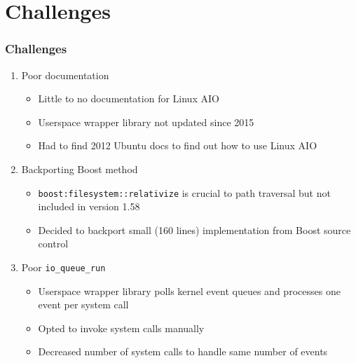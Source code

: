 \documentclass{beamer}
\begin{document}
\section{Challenges}
\begin{frame}
    \frametitle{Challenges}
    \begin{enumerate}[1.]
	\item{Poor documentation}
	    \begin{itemize}
		\item{Little to no documentation for Linux AIO}
		\item{Userspace wrapper library not updated since 2015}
		\item{Had to find 2012 Ubuntu docs to find out how to use Linux AIO~\cite{ubuntu}}
	    \end{itemize}
	\item{Backporting Boost method }
	    \begin{itemize}
		\item{\texttt{boost:filesystem::relativize} is crucial to path
		    traversal but not included in version 1.58 }
		\item{Decided to backport small (160 lines) implementation from
		    Boost source control }
	    \end{itemize}
	\item{Poor \texttt{io\_queue\_run} }
	    \begin{itemize}
		\item{Userspace wrapper library polls kernel event queues and processes one event per system call }
		\item{Opted to invoke system calls manually }
		\item{Decreased number of system calls to handle same number of events}
	    \end{itemize}
    \end{enumerate}
\end{frame}
\end{document}
